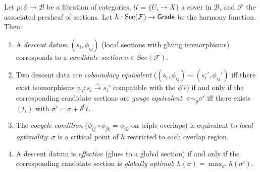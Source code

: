 \begin{theorem}
\label{thm:descent-opt}
Let $p : \mathcal{E} \to \mathcal{B}$ be a fibration of categories,
$\mathcal{U} = \{U_i \to X\}$ a cover in $\mathcal{B}$, and
$\mathcal{F}$ the associated presheaf of sections.  Let
$h : \mathrm{Sec}(\mathcal{F}) \to \mathsf{Grade}$ be the harmony function.
Then:
\begin{enumerate}[label=(\roman*)]
\item A \emph{descent datum} $(s_i, \phi_{ij})$ (local sections
  with gluing isomorphisms) corresponds to a \emph{candidate section}
  $\sigma \in \mathrm{Sec}(\mathcal{F})$.
\item Two descent data are \emph{coboundary equivalent}
  ($(s_i, \phi_{ij}) \sim (s_i', \phi_{ij}')$ iff there exist
  isomorphisms $\psi_i : s_i \xrightarrow{\sim} s_i'$ compatible with
  the $\phi$'s) if and only if the corresponding candidate sections
  are \emph{gauge equivalent}: $\sigma \sim_g \sigma'$ iff there
  exists $(t_i)$ with $\sigma' = \sigma + \delta^0 t$.
\item The \emph{cocycle condition} ($\phi_{ij} \circ \phi_{jk} =
  \phi_{ik}$ on triple overlaps) is equivalent to \emph{local
  optimality}: $\sigma$ is a critical point of $h$ restricted to
  each overlap region.
\item A descent datum is \emph{effective} (glues to a global section)
  if and only if the corresponding candidate section is \emph{globally
  optimal}: $h(\sigma) = \max_{\sigma'} h(\sigma')$.
\end{enumerate}
\end{theorem}

